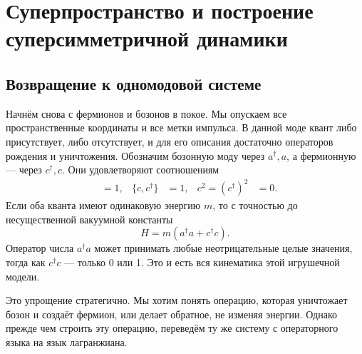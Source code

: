 \chapter{Суперпространство и построение суперсимметричной динамики}


\section{Возвращение к одномодовой системе}

Начнём снова с фермионов и бозонов в покое. Мы опускаем все пространственные координаты и все метки импульса. В данной моде квант либо присутствует, либо отсутствует, и для его описания достаточно операторов рождения и уничтожения. Обозначим бозонную моду через \(a^\dagger,a\), а фермионную — через \(c^\dagger,c\). Они удовлетворяют соотношениям
\begin{align}
[a,a^\dagger]&=1,
&
\{c,c^\dagger\}&=1,
&
c^2=(c^\dagger)^2&=0.
\end{align}
Если оба кванта имеют одинаковую энергию \(m\), то с точностью до несущественной вакуумной константы
\begin{equation}
H=m\left(a^\dagger a+c^\dagger c\right).
\label{eq:l7-one-mode-hamiltonian}
\end{equation}
Оператор числа \(a^\dagger a\) может принимать любые неотрицательные целые значения, тогда как \(c^\dagger c\) — только 0 или 1. Это и есть вся кинематика этой игрушечной модели.

Это упрощение стратегично. Мы хотим понять операцию, которая уничтожает бозон и создаёт фермион, или делает обратное, не изменяя энергии. Однако прежде чем строить эту операцию, переведём ту же систему с операторного языка на язык лагранжиана.

